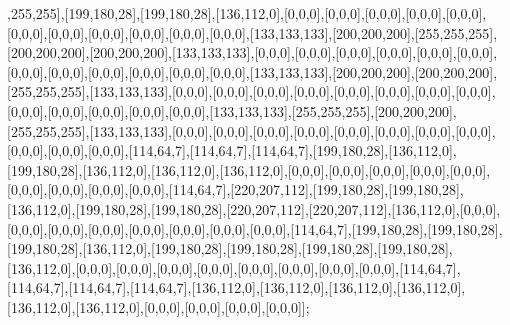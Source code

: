 ,255,255],[199,180,28],[199,180,28],[136,112,0],[0,0,0],[0,0,0],[0,0,0],[0,0,0],[0,0,0],[0,0,0],[0,0,0],[0,0,0],[0,0,0],[0,0,0],[0,0,0],[133,133,133],[200,200,200],[255,255,255],[200,200,200],[200,200,200],[133,133,133],[0,0,0],[0,0,0],[0,0,0],[0,0,0],[0,0,0],[0,0,0],[0,0,0],[0,0,0],[0,0,0],[0,0,0],[0,0,0],[0,0,0],[133,133,133],[200,200,200],[200,200,200],[255,255,255],[133,133,133],[0,0,0],[0,0,0],[0,0,0],[0,0,0],[0,0,0],[0,0,0],[0,0,0],[0,0,0],[0,0,0],[0,0,0],[0,0,0],[0,0,0],[0,0,0],[133,133,133],[255,255,255],[200,200,200],[255,255,255],[133,133,133],[0,0,0],[0,0,0],[0,0,0],[0,0,0],[0,0,0],[0,0,0],[0,0,0],[0,0,0],[0,0,0],[0,0,0],[0,0,0],[114,64,7],[114,64,7],[114,64,7],[199,180,28],[136,112,0],[199,180,28],[136,112,0],[136,112,0],[136,112,0],[0,0,0],[0,0,0],[0,0,0],[0,0,0],[0,0,0],[0,0,0],[0,0,0],[0,0,0],[0,0,0],[114,64,7],[220,207,112],[199,180,28],[199,180,28],[136,112,0],[199,180,28],[199,180,28],[220,207,112],[220,207,112],[136,112,0],[0,0,0],[0,0,0],[0,0,0],[0,0,0],[0,0,0],[0,0,0],[0,0,0],[0,0,0],[114,64,7],[199,180,28],[199,180,28],[199,180,28],[136,112,0],[199,180,28],[199,180,28],[199,180,28],[199,180,28],[136,112,0],[0,0,0],[0,0,0],[0,0,0],[0,0,0],[0,0,0],[0,0,0],[0,0,0],[0,0,0],[114,64,7],[114,64,7],[114,64,7],[114,64,7],[136,112,0],[136,112,0],[136,112,0],[136,112,0],[136,112,0],[136,112,0],[0,0,0],[0,0,0],[0,0,0],[0,0,0]];

